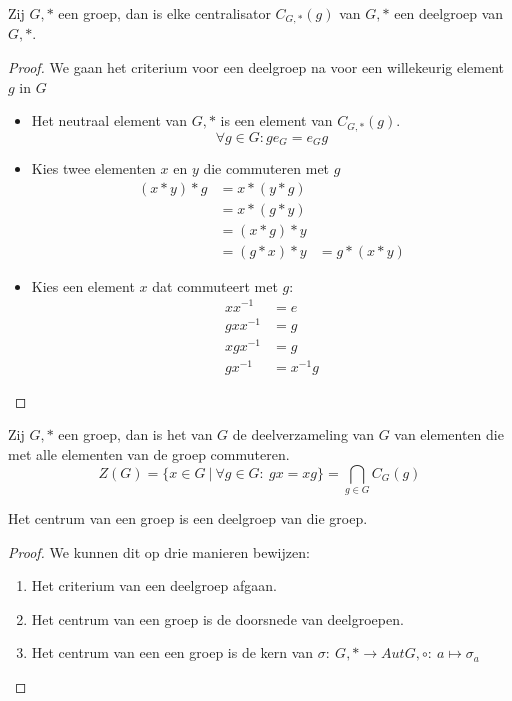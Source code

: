 \documentclass[main.tex]{subfiles}
\begin{document}
\begin{ei}
  \label{ei:centralisator-is-deelgroep}
  Zij $G,*$ een groep, dan is elke centralisator $C_{G,*}(g)$ van $G,*$ een deelgroep van $G,*$.
  \begin{proof}
    We gaan het criterium voor een deelgroep na voor een willekeurig element $g$ in $G$
    \begin{itemize}
    \item Het neutraal element van $G,*$ is een element van $C_{G,*}(g)$.
      \[ \forall g\in G: ge_{G} = e_{G}g \]
    \item Kies twee elementen $x$ en $y$ die commuteren met $g$
      \[
      \begin{array}{rll}
        (x*y)*g &= x*(y*g)&\\
                &= x*(g*y) &\\
                &= (x*g)*y &\\
                &= (g*x)*y &= g*(x*y)
      \end{array}
      \]
    \item Kies een element $x$ dat commuteert met $g$:
      \[
      \begin{array}{rl}
        xx^{-1} &= e\\
        gxx^{-1} &= g\\
        xgx^{-1} &= g\\
        gx^{-1} &= x^{-1}g
      \end{array}
      \]
    \end{itemize}
  \end{proof}
\end{ei}

\begin{de}
  \label{de:centrum}
  Zij $G,*$ een groep, dan is het  van $G$ de deelverzameling van $G$ van elementen die met alle elementen van de groep commuteren.
  \[ Z(G) = \{ x \in G\ |\ \forall g \in G:\ gx = xg\} = \bigcap_{g \in G}C_{G}(g) \]
\end{de}

\begin{ei}
  \label{ei:centrum-is-deelgroep}
  Het centrum van een groep is een deelgroep van die groep.

  \begin{proof}
    We kunnen dit op drie manieren bewijzen:
    \begin{enumerate}
    \item Het criterium van een deelgroep afgaan.
    \item Het centrum van een groep is de doorsnede van deelgroepen. 
    \item Het centrum van een een groep is de kern van $\sigma:\ G,* \rightarrow Aut G,\circ:\ a \mapsto \sigma_{a}$
    \end{enumerate}
  \end{proof}
\end{ei}
\end{document}
